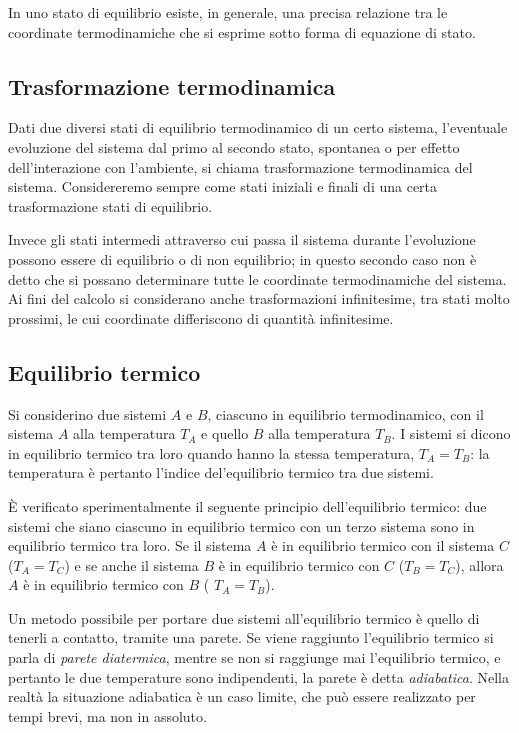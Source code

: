 \documentclass[class=book, crop=false, oneside, 12pt]{standalone}
\begin{document}
In uno stato di equilibrio esiste, in generale, una precisa relazione tra le coordinate termodinamiche che si esprime sotto forma di equazione di stato.

\subsection{Trasformazione termodinamica}

Dati due diversi stati di equilibrio termodinamico di un certo sistema, l'eventuale evoluzione del sistema dal primo al secondo stato, spontanea o per effetto dell'interazione con l'ambiente, si chiama trasformazione termodinamica del sistema. 
Considereremo sempre come stati iniziali e finali di una certa trasformazione stati di equilibrio. 

Invece gli stati intermedi attraverso cui passa il sistema durante l'evoluzione possono essere di equilibrio o di non equilibrio; in questo secondo caso non è detto che si possano determinare tutte le coordinate termodinamiche del sistema. 
Ai fini del calcolo si considerano anche trasformazioni infinitesime, tra stati molto prossimi, le cui coordinate differiscono di quantità infinitesime.

\subsection{Equilibrio termico}

Si considerino due sistemi \(A\) e \(B\), ciascuno in equilibrio termodinamico, con il sistema \(A\) alla temperatura \(T_A\) e quello \(B\) alla temperatura \(T_B\).
I sistemi si dicono in equilibrio termico tra loro quando hanno la stessa temperatura, \(T_A = T_B\): la temperatura è pertanto l'indice del'equilibrio termico tra due sistemi. 

È verificato sperimentalmente il seguente principio dell'equilibrio termico: due sistemi che siano ciascuno in equilibrio termico con un terzo sistema sono in equilibrio termico tra loro. 
Se il sistema \(A\) è in equilibrio termico con il sistema \(C\) (\(T_A = T_C\)) e se anche il sistema \(B\) è in equilibrio termico con \(C\) (\(T_B = T_C\)), allora \(A\) è in equilibrio termico con \(B\) ( \(T_A = T_B\)).

Un metodo possibile per portare due sistemi all'equilibrio termico è quello di tenerli a contatto, tramite una parete. 
Se viene raggiunto l'equilibrio termico si parla di \emph{parete diatermica}, mentre se non si raggiunge mai l'equilibrio termico, e pertanto le due temperature sono indipendenti, la parete è detta \emph{adiabatica}. 
Nella realtà la situazione adiabatica è un caso limite, che può essere realizzato per tempi brevi, ma non in assoluto.
\end{document}
